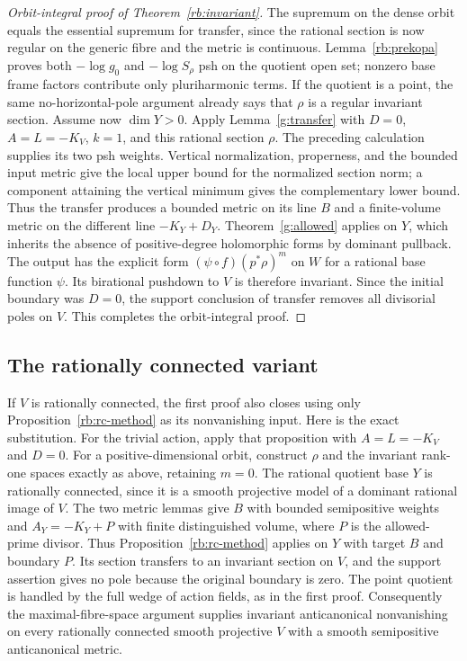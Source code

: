 \begin{proof}[Orbit-integral proof of Theorem~\ref{rb:invariant}]
The supremum on the dense orbit equals the essential supremum for
transfer, since the rational section is now regular on the generic
fibre and the metric is continuous.  Lemma~\ref{rb:prekopa} proves
both $-\log g_0$ and $-\log S_\rho$ psh on the quotient open set;
nonzero base frame factors contribute only pluriharmonic terms.
If the quotient is a point, the same no-horizontal-pole argument
already says that $\rho$ is a regular invariant section. Assume now
$\dim Y>0$. Apply Lemma~\ref{g:transfer} with
$D=0$, $A=L=-K_V$, $k=1$, and this rational section $\rho$.
The preceding calculation supplies its two psh weights. Vertical
normalization, properness, and the bounded input metric give the local
upper bound for the normalized section norm; a component attaining
the vertical minimum gives the complementary lower bound. Thus the
transfer produces a bounded metric on its line $B$ and a finite-volume
metric on the different line $-K_Y+D_Y$.
Theorem~\ref{g:allowed} applies on $Y$, which inherits the absence of
positive-degree holomorphic forms by dominant pullback. The output has
the explicit form $(\psi\circ f)(p^*\rho)^m$ on $W$ for a rational
base function $\psi$. Its birational pushdown to $V$ is therefore invariant. Since the initial boundary was
$D=0$, the support conclusion of transfer removes all divisorial poles
on $V$. This completes the orbit-integral proof.
\end{proof}

\subsection{The rationally connected variant}
\label{rb:rc-invariant}
If $V$ is rationally connected, the first proof also closes using only
Proposition~\ref{rb:rc-method} as its nonvanishing input.  Here is the
exact substitution.  For the trivial action, apply that proposition
with $A=L=-K_V$ and $D=0$.  For a positive-dimensional orbit, construct
$\rho$ and the invariant rank-one spaces exactly as above, retaining
$m=0$.  The rational quotient base $Y$ is rationally connected, since
it is a smooth projective model of a dominant rational image of $V$.
The two metric lemmas give $B$ with bounded semipositive weights and
$A_Y=-K_Y+P$ with finite distinguished volume, where $P$ is the
allowed-prime divisor.  Thus Proposition~\ref{rb:rc-method} applies on
$Y$ with target $B$ and boundary $P$.  Its section transfers to an
invariant section on $V$, and the support assertion gives no pole
because the original boundary is zero.  The point quotient is handled
by the full wedge of action fields, as in the first proof.  Consequently
the maximal-fibre-space argument supplies invariant anticanonical
nonvanishing on every rationally connected smooth projective $V$ with
a smooth semipositive anticanonical metric.

